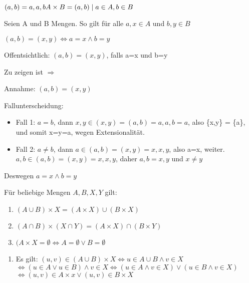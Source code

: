 \documentclass{../../meta/tudscript}
\begin{document}

\((a,b) = {{a}, {a,b}} \\ A \times B = {(a,b) \mid a \in A, b \in B}\)


Seien A und B Mengen. So gilt für alle \(a,x \in A\) und \(b, y \in B\)

\((a,b)=(x,y) \iff a = x \wedge b = y\)


Offentsichtlich: \((a,b) = (x,y)\), falls a=x und b=y

Zu zeigen ist \(\Rightarrow\)

Annahme: \((a,b) = (x,y)\)

Fallunterscheidung:
\begin{itemize}

\item
	Fall 1: \(a=b\), dann
	\({x,y} \in (x,y)= (a,b) = {{a}, {a,b}} = {{a}}\), also \{x,y\} = \{a\},
	und somit x=y=a, wegen Extensionalität.

\item
  Fall 2: \(a \neq b\), dann \({a} \in (a,b)=(x,y) = {{x}, {x,y}}\),
  also a=x, weiter. \({a,b} \in (a,b) = (x,y) = {{x}, {x,y}}\), daher
  \({a,b} = {x,y}\) und \(x \neq y\)
\end{itemize}

Deswegen \(a = x \wedge b = y\)


Für beliebige Mengen \(A,B,X,Y\) gilt:

\begin{enumerate}
\def\labelenumi{\arabic{enumi}.}

\item
  \((A \cup B) \times X = (A \times X) \cup (B \times X)\)
\item
  \((A \cap B) \times (X \cap Y) = (A \times X) \cap (B \times Y)\)
\item
  \((A \times X = \emptyset \iff A = \emptyset \vee B = \emptyset\)
\end{enumerate}


\begin{enumerate}
\def\labelenumi{\arabic{enumi}.}

\item
  Es gilt:
  \((u,v) \in (A \cup B) \times X \iff u \in A \cup B \wedge v \in X\)
  \(\iff (u \in A \vee u \in B) \wedge v \in X \iff (u \in A \wedge v \in X) \vee (u \in B \wedge v \in X)\)
  \(\iff (u,v) \in A \times x \vee (u,v) \in B \times X\)
\end{enumerate}
\end{document}
